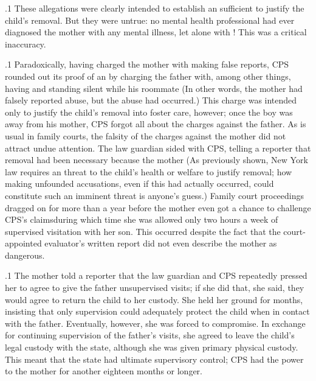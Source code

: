 \documentclass[11pt, twoside]{article}
\begin{document}
{\p.1{%
These allegations were clearly intended to establish an 
sufficient to justify the child's removal. But they were untrue: no mental
health professional had ever diagnosed the mother with any mental illness, let alone with ! This was a critical
inaccuracy.
}%

\p.1{%
Paradoxically, having charged the mother with making false reports,
CPS rounded out its proof of an  by charging the father
with, among other things, having 
and standing silent while his roommate  (In other words, the mother
had falsely reported abuse, but the abuse had occurred.) This charge was
intended only to justify the child's removal into foster care, however;
once the boy was away from his mother, CPS forgot all about the charges
against the father. As is usual in family courts, the falsity of the charges against the
mother did not attract undue attention. The law guardian sided with
CPS, telling a reporter that removal had been necessary because the
mother 
(As previously shown, New York law requires an  threat to
the child's health or welfare to justify removal; how making unfounded
accusations, even if this had actually occurred, could constitute such an
imminent threat is anyone's guess.) Family court proceedings dragged
on for more than a year before the mother even got a chance to challenge
CPS's claims\mdash{}during which time she was allowed only two hours a week
of supervised visitation with her son. This occurred despite the fact that
the court-appointed evaluator's written report did not even describe the
mother as dangerous.
}%

\p.1{%
The mother told a reporter that the law guardian and CPS repeatedly
pressed her to agree to give the father unsupervised visits; if she did
that, she said, they would agree to return the child to her custody. She
held her ground for months, insisting that only supervision could adequately protect the child when in contact with the father. Eventually,
however, she was forced to compromise. In exchange for continuing
supervision of the father's visits, she agreed to leave the child's legal
custody with the state, although she was given primary physical custody. This meant that the state had ultimate supervisory control; CPS
had the power to  the mother for another eighteen months or
longer.
}%

}
\end{document}
